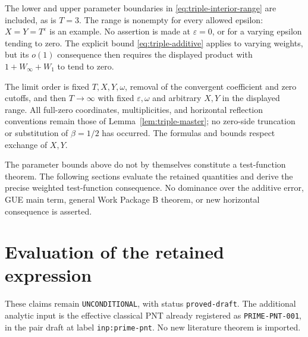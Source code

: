 \documentclass[11pt]{article}
\begin{document}
The lower and upper parameter boundaries in \eqref{eq:triple-interior-range}
are included, as is \(T=3\). The range is nonempty for every allowed
epsilon: \(X=Y=T^\varepsilon\) is an example. No assertion is made at
\(\varepsilon=0\), or for a varying epsilon tending to zero.
The explicit bound \eqref{eq:triple-additive} applies to varying weights,
but its \(o(1)\) consequence then requires the displayed product with
\(1+W_\infty+W_1\) to tend to zero.

The limit order is fixed \(T,X,Y,\omega\), removal of the convergent
coefficient and zero cutoffs, and then \(T\to\infty\) with fixed
\(\varepsilon,\omega\) and arbitrary \(X,Y\) in the displayed range.
All full-zero coordinates, multiplicities, and horizontal reflection
conventions remain those of Lemma~\ref{lem:triple-master}; no zero-side
truncation or substitution of \(\beta=1/2\) has occurred.
The formulas and bounds respect exchange of \(X,Y\).

The parameter bounds above do not by themselves constitute a test-function
theorem. The following sections evaluate the retained quantities and
derive the precise weighted test-function consequence. No dominance over
the additive error, GUE main term, general Work Package B theorem, or new
horizontal consequence is asserted.

\section{Evaluation of the retained expression}

These claims remain \texttt{UNCONDITIONAL}, with status
\texttt{proved-draft}. The additional analytic input is the effective
classical PNT already registered as \texttt{PRIME-PNT-001}, in the pair
draft at label \texttt{inp:prime-pnt}. No new literature theorem is imported.
\end{document}
